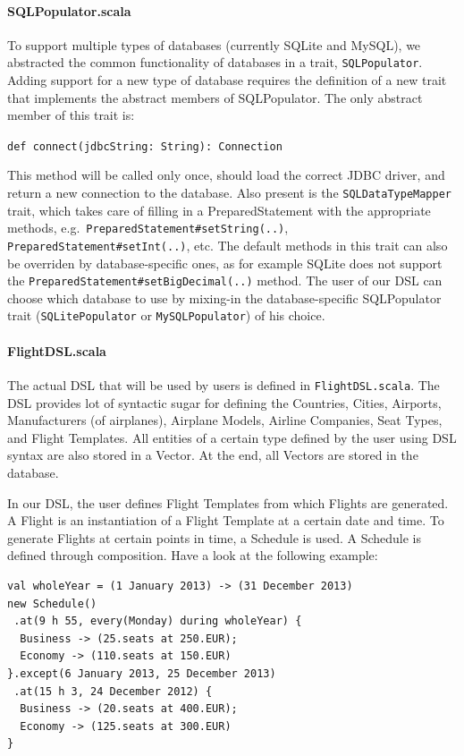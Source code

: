 \documentclass[a4paper]{article}
\newcommand{\cc}[1]{\texttt{#1}}
\renewcommand{\sc}[1]{\lstinline{#1}}
\begin{document}
\paragraph{SQLPopulator.scala}
To support multiple types of databases (currently SQLite and MySQL), we abstracted the common functionality of databases in a trait, \cc{SQL\-Populator}.
Adding support for a new type of database requires the definition of a new trait that implements the abstract members of SQLPopulator.
The only abstract member of this trait is:

\sc{def connect(jdbcString: String): Connection}

This method will be called only once, should load the correct JDBC driver, and return a new connection to the database.
Also present is the \cc{SQLDataTypeMapper} trait, which takes care of filling in a PreparedStatement with the appropriate methods, e.g.\ \cc{Prepared\-State\-ment\-\#set\-String(..)}, \cc{Prepared\-State\-ment\-\#set\-Int(..)}, etc.
The default methods in this trait can also be overriden by database-specific ones, as for example SQLite does not support the \cc{Prepared\-State\-ment\-\#set\-Big\-Decimal(..)} method.
The user of our DSL can choose which database to use by mixing-in the database-specific SQLPopulator trait (\cc{SQLitePopulator} or \cc{MySQL\-Populator}) of his choice.

\paragraph{FlightDSL.scala}
The actual DSL that will be used by users is defined in \cc{Flight\-DSL.scala}.
The DSL provides lot of syntactic sugar for defining the Countries, Cities, Airports, Manufacturers (of airplanes), Airplane Models, Airline Companies, Seat Types, and Flight Templates.
All entities of a certain type defined by the user using DSL syntax are also stored in a Vector.
At the end, all Vectors are stored in the database.

In our DSL, the user defines Flight Templates from which Flights are generated.
A Flight is an instantiation of a Flight Template at a certain date and time.
To generate Flights at certain points in time, a Schedule is used.
A Schedule is defined through composition.
Have a look at the following example:
\begin{lstlisting}
val wholeYear = (1 January 2013) -> (31 December 2013)
new Schedule()
 .at(9 h 55, every(Monday) during wholeYear) {
  Business -> (25.seats at 250.EUR);
  Economy -> (110.seats at 150.EUR)
}.except(6 January 2013, 25 December 2013)
 .at(15 h 3, 24 December 2012) {
  Business -> (20.seats at 400.EUR);
  Economy -> (125.seats at 300.EUR)
}
\end{lstlisting}
\end{document}
